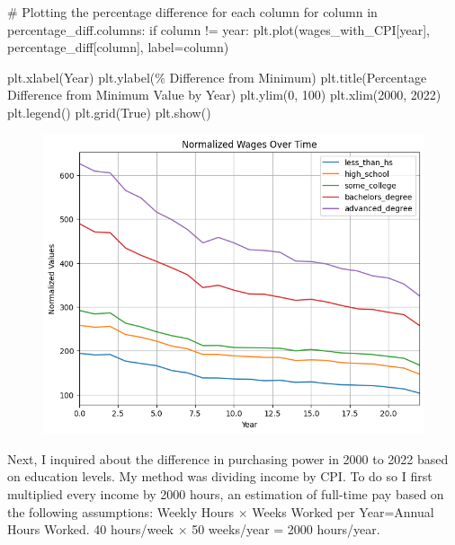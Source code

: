 \documentclass[
  letterpaper,
  DIV=11,
  numbers=noendperiod]{scrartcl}
\newenvironment{Shaded}{\begin{snugshade}}{\end{snugshade}}
\newcommand{\CommentTok}[1]{\textcolor[rgb]{0.37,0.37,0.37}{#1}}
\newcommand{\ControlFlowTok}[1]{\textcolor[rgb]{0.00,0.23,0.31}{#1}}
\newcommand{\DecValTok}[1]{\textcolor[rgb]{0.68,0.00,0.00}{#1}}
\newcommand{\KeywordTok}[1]{\textcolor[rgb]{0.00,0.23,0.31}{#1}}
\newcommand{\NormalTok}[1]{\textcolor[rgb]{0.00,0.23,0.31}{#1}}
\newcommand{\OperatorTok}[1]{\textcolor[rgb]{0.37,0.37,0.37}{#1}}
\newcommand{\StringTok}[1]{\textcolor[rgb]{0.13,0.47,0.30}{#1}}
\newcommand{\VariableTok}[1]{\textcolor[rgb]{0.07,0.07,0.07}{#1}}
\begin{document}
\begin{Shaded}
\begin{Highlighting}[]
\CommentTok{\# Plotting the percentage difference for each column}
\ControlFlowTok{for}\NormalTok{ column }\KeywordTok{in}\NormalTok{ percentage\_diff.columns:}
    \ControlFlowTok{if}\NormalTok{ column }\OperatorTok{!=} \StringTok{\textquotesingle{}year\textquotesingle{}}\NormalTok{:  }
\NormalTok{        plt.plot(wages\_with\_CPI[}\StringTok{\textquotesingle{}year\textquotesingle{}}\NormalTok{], percentage\_diff[column], label}\OperatorTok{=}\NormalTok{column)}

\NormalTok{plt.xlabel(}\StringTok{\textquotesingle{}Year\textquotesingle{}}\NormalTok{)}
\NormalTok{plt.ylabel(}\StringTok{\textquotesingle{}\% Difference from Minimum\textquotesingle{}}\NormalTok{)}
\NormalTok{plt.title(}\StringTok{\textquotesingle{}Percentage Difference from Minimum Value by Year\textquotesingle{}}\NormalTok{)}
\NormalTok{plt.ylim(}\DecValTok{0}\NormalTok{, }\DecValTok{100}\NormalTok{)}
\NormalTok{plt.xlim(}\DecValTok{2000}\NormalTok{, }\DecValTok{2022}\NormalTok{)}
\NormalTok{plt.legend()}
\NormalTok{plt.grid(}\VariableTok{True}\NormalTok{)}
\NormalTok{plt.show()}
\end{Highlighting}
\end{Shaded}

\begin{figure}[H]

{\centering \includegraphics{Markdown_files/figure-pdf/cell-8-output-1.png}

}

\end{figure}

Next, I inquired about the difference in purchasing power in 2000 to
2022 based on education levels. My method was dividing income by CPI. To
do so I first multiplied every income by 2000 hours, an estimation of
full-time pay based on the following assumptions: Weekly Hours × Weeks
Worked per Year=Annual Hours Worked. 40 hours/week × 50 weeks/year =
2000 hours/year.
\end{document}
